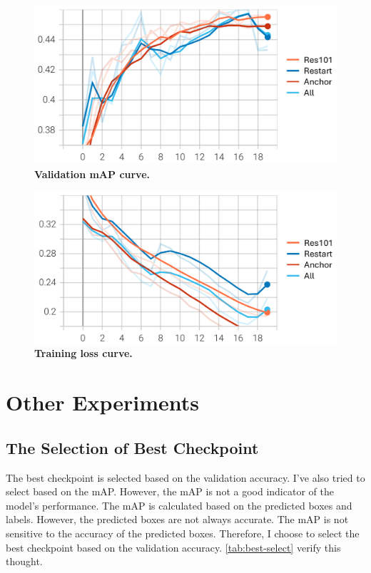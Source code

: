 \documentclass[10pt,twocolumn,letterpaper]{article}
\begin{document}
\begin{figure}[h]
  \centering
  \includegraphics[width=0.9\linewidth]{assets/val_mAP.png}
  \caption{\textbf{Validation mAP curve.}}
  \label{fig:val-mAP}
\end{figure}

\begin{figure}[h]
  \centering
  \includegraphics[width=0.9\linewidth]{assets/train_loss.png}
  \caption{\textbf{Training loss curve.}}
  \label{fig:train-loss}
\end{figure}

\section*{Other Experiments}

\subsection*{The Selection of Best Checkpoint}

The best checkpoint is selected based on the validation accuracy. I've
also tried to select based on the mAP. However, the
mAP is not a good indicator of the model's performance. The mAP is
calculated based on the predicted boxes and labels. However, the
predicted boxes are not always accurate. The mAP is not sensitive to
the accuracy of the predicted boxes. Therefore, I choose to select
the best checkpoint based on the validation accuracy. \cref{tab:best-select}
verify this thought.
\end{document}
